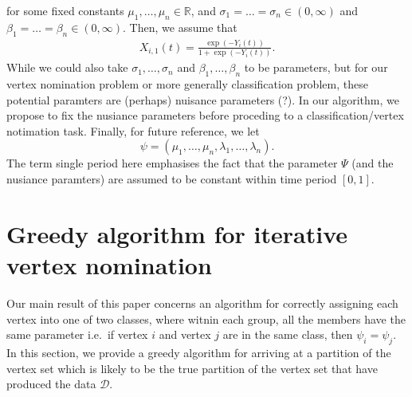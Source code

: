 \documentclass[12pt]{article}%
\begin{document}
for some fixed constants $\mu_1,\ldots, \mu_n \in \mathbb R$, and $\sigma_1 = \ldots = \sigma_n \in (0,\infty)$ and $\beta_1 = \ldots = \beta_n \in (0,\infty)$. 
Then, we assume that 
\begin{eqnarray}
X_{i,1}(t) = \frac{\exp(-Y_i(t))}{1+\exp(-Y_i(t))}.
\end{eqnarray}
While we could also take $\sigma_1,\ldots,\sigma_n$ and $\beta_1,\ldots, \beta_n$ to be parameters, 
but for our vertex nomination problem or more generally classification problem, 
these potential paramters are (perhaps) nuisance parameters (?).  
In our algorithm, we propose to fix the nusiance parameters before proceding to a classification/vertex notimation task.
Finally, for future reference, we let
$$
\psi = (\mu_1,\ldots, \mu_n,\lambda_1,\ldots,\lambda_n).
$$
The term single period here emphasises the fact that the parameter $\Psi$ (and the nusiance paramters) are assumed to be constant within time period $[0,1]$. 
\section{Greedy algorithm for iterative vertex nomination}
Our main result of this paper concerns an algorithm 
for correctly assigning each vertex into one of two classes, where witnin each group, all the members  
have the same parameter i.e.\ if vertex $i$ and vertex $j$ are in the same
class, then $\psi_i = \psi_j$.  
In this section, we provide a greedy algorithm for arriving at a partition 
of the vertex set which is likely to be the true partition of 
the vertex set that  have produced the data $\mathcal D$.
\end{document}
